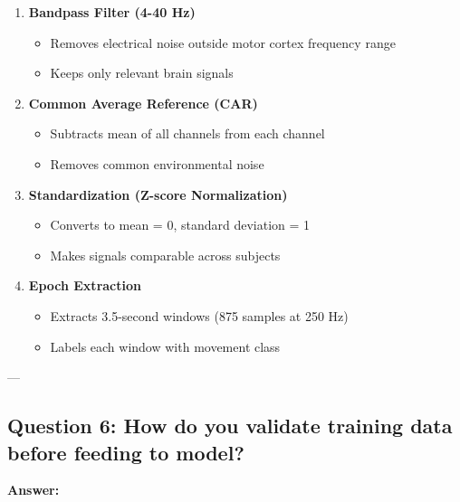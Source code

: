 \documentclass[12pt,a4paper]{article}
\begin{document}
\begin{enumerate}
    \item \textbf{Bandpass Filter (4-40 Hz)}
    \begin{itemize}
        \item Removes electrical noise outside motor cortex frequency range
        \item Keeps only relevant brain signals
    \end{itemize}
    
    \item \textbf{Common Average Reference (CAR)}
    \begin{itemize}
        \item Subtracts mean of all channels from each channel
        \item Removes common environmental noise
    \end{itemize}
    
    \item \textbf{Standardization (Z-score Normalization)}
    \begin{itemize}
        \item Converts to mean = 0, standard deviation = 1
        \item Makes signals comparable across subjects
    \end{itemize}
    
    \item \textbf{Epoch Extraction}
    \begin{itemize}
        \item Extracts 3.5-second windows (875 samples at 250 Hz)
        \item Labels each window with movement class
    \end{itemize}
\end{enumerate}

---

\subsection{Question 6: How do you validate training data before feeding to model?}

\textbf{Answer:}
\end{document}

